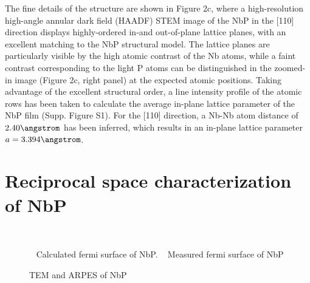 The fine details of the structure are shown in Figure 2c, where a high-resolution 
high-angle annular dark field (HAADF) STEM image of the NbP in the [110] direction 
displays highly-ordered in-and out-of-plane lattice planes, with an excellent matching
to the NbP structural model.  The lattice planes are particularly visible by the high 
atomic contrast of the Nb atoms, while a faint contrast corresponding to the light P 
atoms can be distinguished in the zoomed-in image (Figure 2c, right panel) at the 
expected atomic positions. Taking advantage of the excellent structural order, a line 
intensity profile of the atomic rows has been taken to calculate the average in-plane 
lattice parameter of the NbP film (Supp. Figure S1). For the [110] direction, a Nb-Nb 
atom distance of $2.40 \angstrom$ has been inferred, which results in an in-plane lattice parameter 
$a=3.394 \angstrom$.  

\section{Reciprocal space characterization of NbP}

  \begin{figure}
    \centering
    \\
    \caption{
        \sfA~ Calculated fermi surface of NbP.
        \sfB~ Measured fermi surface of NbP
    }
\end{figure}

\begin{figure}
    \centering

    
    \caption{
       TEM and ARPES of NbP
    }
\end{figure}


